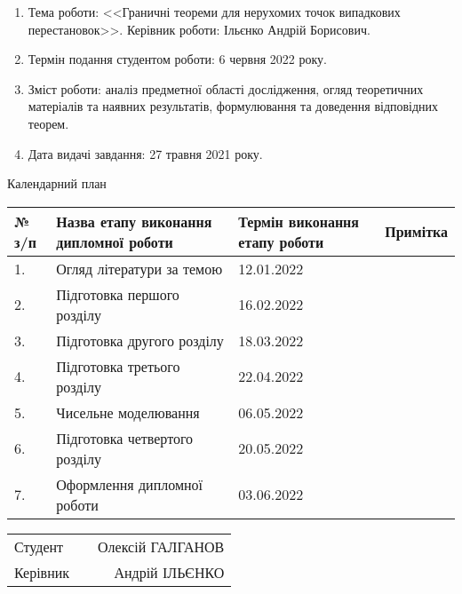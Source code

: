 \begin{enumerate}[1.]
    \item Тема роботи: <<Граничні теореми для нерухомих точок випадкових перестановок>>.
    Керівник роботи: Ільєнко Андрій Борисович.
    \item Термін подання студентом роботи: 6 червня 2022 року.
    \item Зміст роботи: аналіз предметної області дослідження, огляд теоретичних матеріалів та
    наявних результатів, формулювання та доведення відповідних теорем.
    \item Дата видачі завдання: 27 травня 2021 року.
\end{enumerate}
\begin{center}
    Календарний план
    \begin{tabular}{|p{0.7cm}|p{7cm}|p{4cm}|p{2cm}|}
        \hline 
        № з/п & Назва етапу виконання \newline дипломної роботи & Термін виконання етапу роботи & Примітка \\
        \hline 
        1. & Огляд літератури за темою & 12.01.2022 & \\
        \hline
        2. & Підготовка першого розділу & 16.02.2022 & \\
        \hline
        3. & Підготовка другого розділу & 18.03.2022 & \\
        \hline
        4. & Підготовка третього розділу & 22.04.2022 & \\
        \hline
        5. & Чисельне моделювання & 06.05.2022 & \\
        \hline
        6. & Підготовка четвертого розділу & 20.05.2022 & \\
        \hline
        7. & Оформлення дипломної роботи & 03.06.2022 & \\
        \hline
    \end{tabular}
    \vspace{5mm}

    \begin{tabular}{lp{9cm}r}
        Студент & & Олексій ГАЛГАНОВ \\
        Керівник & & Андрій ІЛЬЄНКО
    \end{tabular}
\end{center}
\newpage